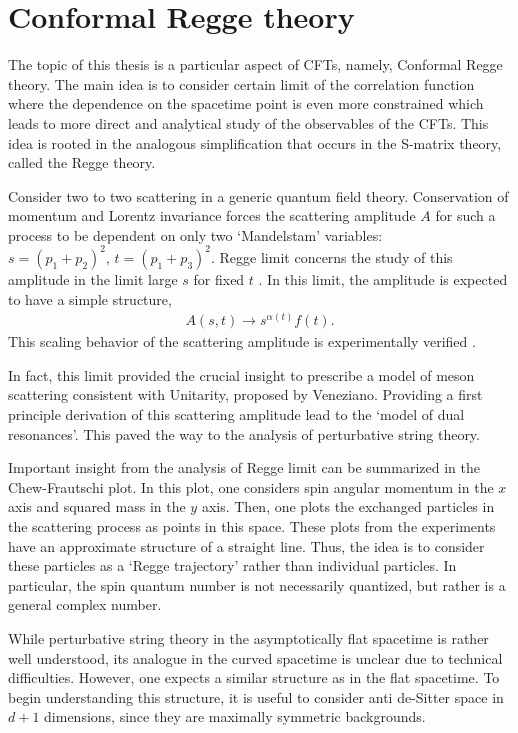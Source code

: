 \section*{Conformal Regge theory}

The topic of this thesis is a particular aspect of CFTs, namely, Conformal Regge theory.
The main idea is to consider certain limit of the correlation function where the dependence on the spacetime point is even more constrained which leads to more direct and analytical study of the observables of the CFTs.
This idea is rooted in the analogous simplification that occurs in the S-matrix theory, called the Regge theory.

Consider two to two scattering in a generic quantum field theory.
Conservation of momentum and Lorentz invariance forces the scattering amplitude $ A $  for such a process to be dependent on only two `Mandelstam' variables: $ s=\left( p_1 + p_2 \right)^2,\, t = \left( p_1+p_3 \right)^2 $.
Regge limit concerns the study of this amplitude in the limit large $ s $ for fixed $ t $ .
In this limit, the amplitude is expected to have a simple structure, 
\begin{align}
  A\left( s,t \right) \rightarrow s ^{\alpha\left( t \right)} f\left( t \right)
  .
\end{align}
This scaling behavior of the scattering amplitude is experimentally verified \cite{Gribov:2003nw}.

In fact, this limit provided the crucial insight to prescribe a model of meson scattering consistent with Unitarity, proposed by Veneziano.
Providing a first principle derivation of this scattering amplitude lead to the `model of dual resonances'.
This paved the way to the analysis of perturbative string theory.

Important insight from the analysis of Regge limit can be summarized in the Chew-Frautschi plot.
In this plot, one considers spin angular momentum in the $ x $ axis and squared mass in the $ y $ axis.
Then, one plots the exchanged particles in the scattering process as points in this space.
These plots from the experiments have an approximate structure of a straight line.
Thus, the idea is to consider these particles as a `Regge trajectory' rather than individual particles.
In particular, the spin quantum number is not necessarily quantized, but rather is a general complex number.

While perturbative string theory in the asymptotically flat spacetime is rather well understood, its analogue in the curved spacetime is unclear due to technical difficulties.
However, one expects a similar structure as in the flat spacetime.
To begin understanding this structure, it is useful to consider anti de-Sitter space in $ d+1 $ dimensions, since they are maximally symmetric backgrounds.

